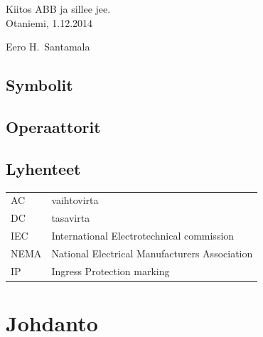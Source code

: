 \documentclass[finnish,12pt,a4paper,pdftex,elec,utf8]{aaltothesis}
\begin{document}

Kiitos ABB ja sillee jee.\\

\vspace{5cm}
Otaniemi, 1.12.2014

\vspace{5mm}
{\hfill Eero H.\ Santamala \hspace{1cm}}

\newpage


\thesistableofcontents



\subsection*{Symbolit}


\subsection*{Operaattorit}



\subsection*{Lyhenteet}

\begin{tabular}{ll}
AC         & vaihtovirta \\
DC         & tasavirta \\
IEC	       & International Electrotechnical commission \\
NEMA       & National Electrical Manufacturers Association \\
IP		   & Ingress Protection marking
\end{tabular}


\cleardoublepage
\storeinipagenumber
{}
\setcounter{page}{1}


\section{Johdanto}
\end{document}
